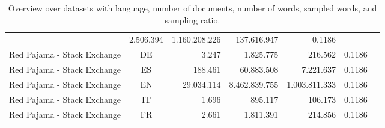 \begin{table*}[tbh]
\begin{minipage}{0.9\textwidth}
\begin{tabular}{lcrrrrr}
& 2.506.394 & 1.160.208.226 %
& 137.616.947 & 0.1186
\\
Red Pajama - Stack Exchange & DE %
& 3.247 & 1.825.775 %
& 216.562 & 0.1186
\\
Red Pajama - Stack Exchange & ES %
& 188.461 & 60.883.508 %
& 7.221.637 & 0.1186
\\
Red Pajama - Stack Exchange & EN %
& 29.034.114 & 8.462.839.755 %
& 1.003.811.333 & 0.1186
\\
Red Pajama - Stack Exchange & IT %
& 1.696 & 895.117 %
& 106.173 & 0.1186
\\
Red Pajama - Stack Exchange & FR %
& 2.661 & 1.811.391 %
& 214.856 & 0.1186
\\
\bottomrule
\end{tabular}
\end{minipage}
\smallskip
\caption{\label{tab:datasets1}%
Overview over datasets with language, number of documents, number of words, sampled words, and sampling ratio.}
\end{table*}


